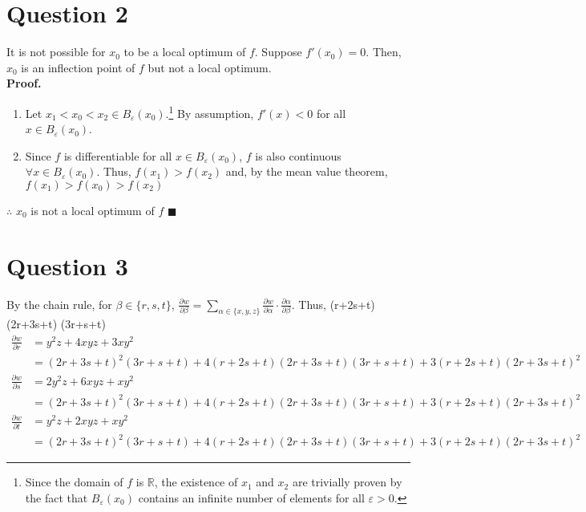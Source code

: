 \documentclass{article}
\newcommand{\R}{\mathbb{R}}
\begin{document}
\section*{Question 2}
It is not possible for $x_0$ to be a local optimum of $f$. Suppose $f'(x_0)=0$. Then, $x_0$ is an inflection point of $f$ but not a local optimum.
\medskip \\
\textbf{Proof.}
\begin{enumerate}
	\item Let $x_1<x_0<x_2\in B_\varepsilon(x_0)$.\footnote{Since the domain of $f$ is $\R$, the existence of $x_1$ and $x_2$ are trivially proven by the fact that $B_\varepsilon(x_0)$ contains an infinite number of elements for all $\varepsilon>0$.}  By assumption, $f'(x)<0$ for all $x\in  B_\varepsilon(x_0)$. 
	\item Since $f$ is differentiable for all $x\in  B_\varepsilon(x_0)$, $f$ is also continuous  $\forall x\in  B_\varepsilon(x_0)$. Thus, $f(x_1)>f(x_2)$ and, by the mean value theorem, $f(x_1)>f(x_0)>f(x_2)$
\end{enumerate}
$\therefore$ $x_0$ is not a local optimum of $f$ $\blacksquare$



\section*{Question 3}
By the chain rule, for $\beta\in\{r,s,t\}$, $\frac{\partial w}{\partial\beta}=\sum_{\alpha\in\{x,y,z\}}\frac{\partial w}{\partial\alpha}\cdot\frac{\partial\alpha}{\partial\beta}$. Thus,
(r+2s+t)
(2r+3s+t) 
(3r+s+t)
\begin{align*}
	\frac{\partial w}{\partial r} 	&= y^2z  + 4xyz + 3xy^2 \\
									&= (2r+3s+t)^2(3r+s+t)  + 4(r+2s+t)(2r+3s+t)(3r+s+t) + 3(r+2s+t)(2r+3s+t)^2	\\
	\frac{\partial w}{\partial s} 	&= 2y^2z + 6xyz + xy^2  \\
									&= (2r+3s+t)^2(3r+s+t)  + 4(r+2s+t)(2r+3s+t)(3r+s+t) + 3(r+2s+t)(2r+3s+t)^2	\\
	\frac{\partial w}{\partial t} 	&= y^2z  + 2xyz + xy^2  \\
									&= (2r+3s+t)^2(3r+s+t)  + 4(r+2s+t)(2r+3s+t)(3r+s+t) + 3(r+2s+t)(2r+3s+t)^2
\end{align*}


\end{document}
